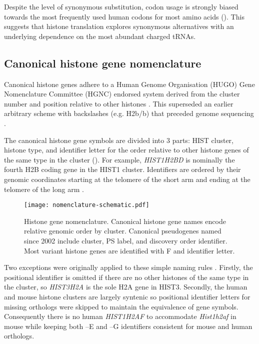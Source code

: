     Despite the level of synonymous substitution,
    codon usage is strongly biased towards the most frequently used
    human codons for most amino acids ().
    This suggests that histone translation explores synonymous alternatives
    with an underlying dependence on the most abundant charged tRNAs.

  \subsection{Canonical histone gene nomenclature}
    Canonical histone genes adhere to a Human Genome Organisation (HUGO)
    Gene Nomenclature Committee (HGNC)
    endorsed system derived from the cluster number and position relative
    to other histones \citep{Marzluff02}.
    This superseded an earlier arbitrary scheme with backslashes (e.g. H2b/b)
    that preceded genome sequencing \citep{AlbigGenomics1997,AlbigHumangen1997}.

    The canonical histone gene symbols are divided into 3 parts:
    HIST cluster, histone type, and identifier letter
    for the order relative to other histone genes of the same type in
    the cluster ().
    For example, \textit{HIST1H2BD} is nominally the fourth H2B coding gene in the HIST1 cluster.
    Identifiers are ordered by their genomic coordinates starting at
    the telomere of the short arm and ending at the telomere of the
    long arm \citep{Marzluff02}.

    \begin{figure*}
      \centering
      \texttt{[image: nomenclature-schematic.pdf]}
      \caption{Histone gene nomenclature.
               Canonical histone gene names encode relative genomic order by cluster.
               Canonical pseudogenes named since 2002 include cluster,
               PS label, and discovery order identifier.
               Most variant histone genes are identified with F and identifier letter.}
      \label{fig:nomenclature}
    \end{figure*}

    Two exceptions were originally applied to these simple naming rules \citep{Marzluff02}.
    Firstly, the positional identifier is omitted if there are no
    other histones of the same type in the cluster,
    so \textit{HIST3H2A} is the sole H2A gene in HIST3.
    Secondly, the human and mouse histone clusters are largely syntenic
    so positional identifier letters for missing orthologs were skipped
    to maintain the equivalence of gene symbols.
    Consequently there is no human \textit{HIST1H2AF} to accommodate
    \textit{Hist1h2af} in mouse while keeping both --E and --G identifiers
    consistent for mouse and human orthologs.

